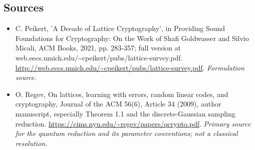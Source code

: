 \documentclass[11pt]{article}
\begin{document}
\subsection{Sources}
\begin{itemize}
\item[S1]C. Peikert, 'A Decade of Lattice Cryptography', in Providing Sound Foundations for Cryptography: On the Work of Shafi Goldwasser and Silvio Micali, ACM Books, 2021, pp. 283-357; full version at web.eecs.umich.edu/\textasciitilde{}cpeikert/pubs/lattice-survey.pdf.
\url{http://web.eecs.umich.edu/~cpeikert/pubs/lattice-survey.pdf}.
\textit{Formulation source.}
\item[E1]O. Regev, On lattices, learning with errors, random linear codes, and cryptography, Journal of the ACM 56(6), Article 34 (2009), author manuscript, especially Theorem 1.1 and the discrete-Gaussian sampling reduction.
\url{https://cims.nyu.edu/~regev/papers/qcrypto.pdf}.
\textit{Primary source for the quantum reduction and its parameter conventions; not a classical resolution.}
\end{itemize}
\end{document}
